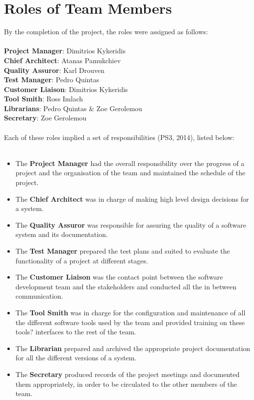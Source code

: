 \documentclass{l3proj}
\begin{document}
\section{Roles of Team Members}
\par
By the completion of the project, the roles were assigned as follows:\\
\\
\textbf{Project Manager}: Dimitrios Kykeridis\\
\textbf{Chief Architect}: Atanas Pamukchiev\\
\textbf{Quality Assuror}: Karl Drouven\\
\textbf{Test Manager}: Pedro Quintas\\
\textbf{Customer Liaison}: Dimitrios Kykeridis\\
\textbf{Tool Smith}: Ross Imlach\\
\textbf{Librarians}: Pedro Quintas \& Zoe Gerolemou\\
\textbf{Secretary}: Zoe Gerolemou\\
\\
Each of these roles implied a set of responsibilities (PS3, 2014), listed below:\\
\\
\begin{itemize}

\item The \textbf{Project Manager} had the overall responsibility over the progress of a project and the organisation of the team and maintained the schedule of the project.
\item The \textbf{Chief Architect} was in charge of making high level design decisions for a system.
\item The \textbf{Quality Assuror} was responsible for assuring the quality of a software system and its documentation.
\item The \textbf{Test Manager} prepared the test plans and suited to evaluate the functionality of a project at different stages.
\item The \textbf{Customer Liaison} was the contact point between the software development team and the stakeholders and conducted all the in between communication.
\item The \textbf{Tool Smith} was in charge for the configuration and maintenance of all the different software tools used by the team and provided training on these tools? interfaces to the rest of the team.
\item The \textbf{Librarian} prepared and archived the appropriate project documentation for all the different versions of a system.
\item The \textbf{Secretary} produced records of the project meetings and documented them appropriately, in order to be circulated to the other members of the team.

\end{itemize}
\end{document}
